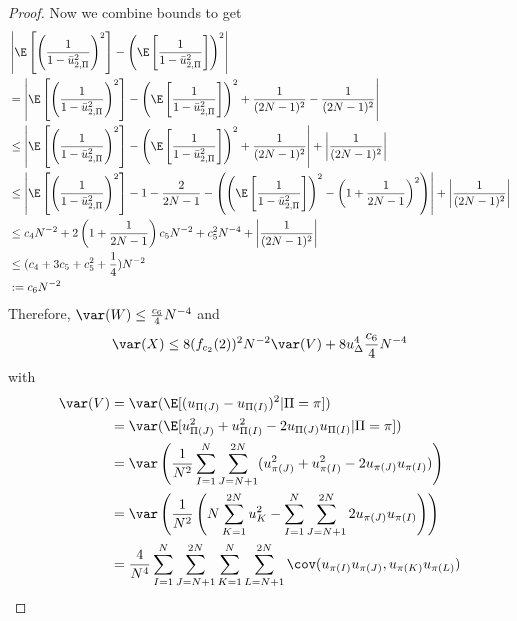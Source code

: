 \begin{proof}
  Now we combine bounds to get
  \begin{align*}
    &\left | \E \left [ \left (\frac{1}{1-\bar{u}_{2,\Pi}^2} \right )^2 \right ] - 
      \left ( \E \left [ \frac{1}{1-\bar{u}_{2,\Pi}^2} \right ] \right )^2 \right | \\
    &= \left | \E \left [ \left (\frac{1}{1-\bar{u}_{2,\Pi}^2} \right )^2 \right ] - 
      \left ( \E \left [ \frac{1}{1-\bar{u}_{2,\Pi}^2} \right ] \right )^2 
    + \frac{1}{(2N-1)^2} - \frac{1}{(2N-1)^2} \right | \\
  &\leq \left | \E \left [ \left (\frac{1}{1-\bar{u}_{2,\Pi}^2} \right )^2 \right ] - 
      \left ( \E \left [ \frac{1}{1-\bar{u}_{2,\Pi}^2} \right ] \right )^2 
      + \frac{1}{(2N-1)^2} \right | + \left | \frac{1}{(2N-1)^2} \right |\\
    &\leq \left | 
      \E \left [ \left (\frac{1}{1-\bar{u}_{2,\Pi}^2} \right )^2 \right ]
      - 1 - \frac{2}{2N-1} - 
      \left ( 
        \left ( \E \left [ \frac{1}{1-\bar{u}_{2,\Pi}^2} \right ] \right )^2 
        - \left ( 1 + \frac{1}{2N-1} \right )^2 
      \right ) \right | + \left | \frac{1}{(2N-1)^2} \right | \\
    &\leq c_4 N^{-2}
    + 2 \left ( 1 + \frac{1}{2N-1} \right ) c_5 N^{-2} + c_5^2 N^{-4} 
    + \left | \frac{1}{(2N-1)^2} \right | \\
    &\leq (c_4 + 3c_5 + c_5^2 + \frac{1}{4}) N^{-2} \\
    &:= c_6 N^{-2}
  \end{align*}
  Therefore, $\var(W) \leq \frac{c_6}{4}N^{-4}$ and 
  \begin{equation*}
    \var(X) \leq 8(f_{c_2}(2))^2 N^{-2} \var(V) + 8u_{\Delta}^4 \frac{c_6}{4} N^{-4}
  \end{equation*}
  with 
  \begin{align*}
    \var(V) &= \var (\E[(u_{\Pi(J)}-u_{\Pi(I)})^2 | \Pi = \pi]) \\
    &= \var(\E[u_{\Pi(J)}^2+u_{\Pi(I)}^2-2u_{\Pi(J)}u_{\Pi(I)}| \Pi = \pi]) \\
    &= \var \left ( \frac{1}{N^2} \sum_{I=1}^{N}\sum_{J=N+1}^{2N}
    (u_{\pi(J)}^2+u_{\pi(I)}^2-2u_{\pi(J)}u_{\pi(I)}) \right ) \\
    &= \var \left ( \frac{1}{N^2} \left ( N \sum_{K=1}^{2N}u_K^2 -
      \sum_{I=1}^{N}\sum_{J=N+1}^{2N}2u_{\pi(J)}u_{\pi(I)} \right ) \right ) \\
    &= \frac{4}{N^4}
    \sum_{I=1}^{N}\sum_{J=N+1}^{2N}\sum_{K=1}^{N}\sum_{L=N+1}^{2N}
    \cov(u_{\pi(I)}u_{\pi(J)},u_{\pi(K)}u_{\pi(L)})

\end{align*}
\end{proof}
